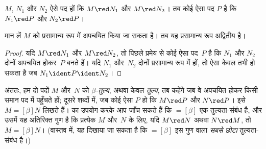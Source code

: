 \documentclass[../../../include/open-logic-section]{subfiles}
\begin{document}

\begin{thm}
$M$, $N_1$ और $N_2$ ऐसे पद हों कि $M \red N_1$ और $M \red N_2$। तब कोई
ऐसा पद $P$ है कि $N_1 \red P$ और $N_2 \red P$।
\end{thm}

\begin{cor}
मान लें $M$ को प्रसामान्य रूप में अपचयित किया जा सकता है। तब यह प्रसामान्य
रूप अद्वितीय है।
\end{cor}

\begin{proof}
यदि $M \red N_1$ और $M \red N_2$, तो पिछले प्रमेय से कोई ऐसा पद~$P$ है
कि $N_1$ और $N_2$ दोनों अपचयित होकर~$P$ बनते हैं। यदि $N_1$ और~$N_2$
दोनों प्रसामान्य रूप में हों, तो ऐसा केवल तभी हो सकता है जब $N_1 \ident P
\ident N_2$।
\end{proof}

अंततः, हम दो पदों $M$ और~$N$ को \emph{$\beta$-तुल्य}, अथवा केवल
\emph{तुल्य}, तब कहेंगे जब वे अपचयित होकर किसी समान पद में पहुँचते हों;
दूसरे शब्दों में, जब कोई ऐसा $P$ हो कि $M \red P$ और $N \red P$। इसे $M
\equal[\beta] N$ लिखते हैं।  का उपयोग करके आप जाँच
सकते हैं कि $\equal[\beta]$ एक तुल्यता-संबंध है, और उसमें यह अतिरिक्त गुण
है कि प्रत्येक $M$ और~$N$ के लिए, यदि $M \red N$ अथवा $N \red M$, तो $M
\equal[\beta] N$। (वास्तव में, यह दिखाया जा सकता है कि $\equal[\beta]$ इस
गुण वाला \emph{सबसे छोटा} तुल्यता-संबंध है।)
\end{document}

